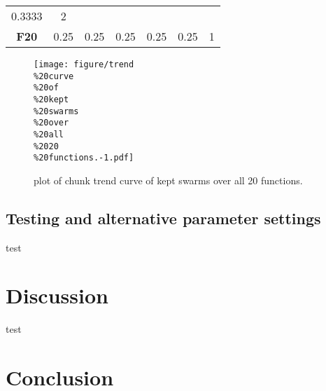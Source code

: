 \documentclass[12pt,a4paper]{article}
\begin{document}
\begin{longtable}[c]{@{}ccccccc@{}}
\begin{minipage}[t]{0.11\columnwidth}\centering\strut
0.3333
\strut\end{minipage} &
\begin{minipage}[t]{0.07\columnwidth}\centering\strut
2
\strut\end{minipage}\tabularnewline
\begin{minipage}[t]{0.11\columnwidth}\centering\strut
\textbf{F20}
\strut\end{minipage} &
\begin{minipage}[t]{0.09\columnwidth}\centering\strut
0.25
\strut\end{minipage} &
\begin{minipage}[t]{0.08\columnwidth}\centering\strut
0.25
\strut\end{minipage} &
\begin{minipage}[t]{0.09\columnwidth}\centering\strut
0.25
\strut\end{minipage} &
\begin{minipage}[t]{0.10\columnwidth}\centering\strut
0.25
\strut\end{minipage} &
\begin{minipage}[t]{0.11\columnwidth}\centering\strut
0.25
\strut\end{minipage} &
\begin{minipage}[t]{0.07\columnwidth}\centering\strut
1
\strut\end{minipage}\tabularnewline
\bottomrule
\end{longtable}

\begin{figure}[htbp]
\centering
\texttt{[image: figure/trend\\\%20curve\\\%20of\\\%20kept\\\%20swarms\\\%20over\\\%20all\\\%2020\\\%20functions.-1.pdf]}
\caption{plot of chunk trend curve of kept swarms over all 20
functions.}
\end{figure}

\subsection{Testing and alternative parameter
settings}\label{testing-and-alternative-parameter-settings}

test

\section{Discussion}\label{discussion}

test

\section{Conclusion}\label{conclusion}
\end{document}
